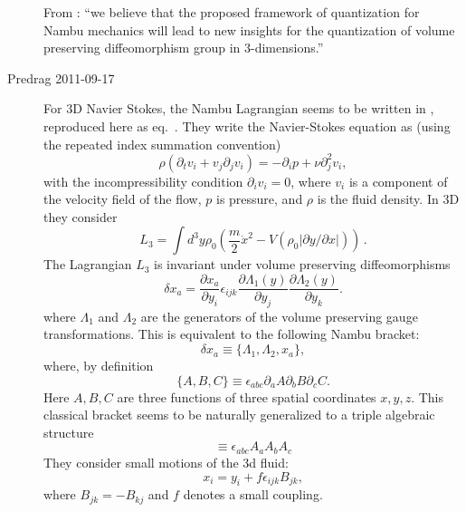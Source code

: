 \begin{description}
From :
``we believe that the proposed framework of quantization for Nambu
mechanics will lead to new insights for the quantization of volume
preserving diffeomorphism group in 3-dimensions.''

\item[Predrag 2011-09-17 ]
For 3D Navier Stokes, the Nambu Lagrangian seems to be written in
, reproduced here as eq.~.
They write the Navier-Stokes equation as (using the repeated index summation convention)
\begin{equation}
\rho (\partial_t v_i + v_j \partial_j v_i) = - \partial_i p + \nu \partial_j^2 v_i,
\end{equation}
with the incompressibility condition $\partial_i v_i = 0$, where $v_i$ is
a component of the velocity field of the flow, $p$ is pressure, and
$\rho$ is the fluid density. In 3D they consider
\begin{equation}
L_3= \int d^3y \rho_0
\left( \frac{m}{2} \dot{x}^2 - V( \rho_0 |{ \partial y}/{\partial x}|) \right)
\,.
\label{MiPlSt11:Lagr}
\end{equation}
The Lagrangian $L_3$ is invariant under volume preserving diffeomorphisms
\begin{equation}
\delta x_a = \frac{\partial x_a}{\partial y_i}\epsilon_{ijk} \frac{\partial \Lambda_1(y)}{\partial y_j}
\frac{\partial \Lambda_2(y)}{\partial y_k}.
\end{equation}
where $\Lambda_1$ and $\Lambda_2$ are the generators of the volume preserving
gauge transformations.
This is equivalent to the following Nambu bracket:
\begin{equation}
\delta x_a \equiv \{\Lambda_1, \Lambda_2, x_a\},
\end{equation}
where, by definition
\begin{equation}
\{A, B, C\}\equiv \epsilon_{abc} \partial_a A \partial_b B \partial_c C.
\end{equation}
Here $A,B,C$ are three functions of three spatial coordinates $x,y,z$.
This classical bracket seems to be naturally generalized to a triple
algebraic structure %
\begin{equation}
[A_i, A_j, A_k] \equiv \epsilon_{abc} A_a A_b A_c
\end{equation}
They consider small motions of the 3d fluid:
\begin{equation}
x_i = y_i + f \epsilon_{ijk} B_{jk},
\end{equation}
where $B_{jk}= - B_{kj}$ and $f$ denotes a small coupling.

\end{description}
